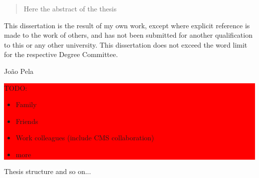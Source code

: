   


\begin{abstract}%
Here the abstract of the thesis
\end{abstract}


\begin{declaration}
  This dissertation is the result of my own work, except where explicit
  reference is made to the work of others, and has not been submitted
  for another qualification to this or any other university. This
  dissertation does not exceed the word limit for the respective Degree
  Committee.
  \vspace*{1cm}
  \begin{flushright}
    João Pela
  \end{flushright}
\end{declaration}


\begin{acknowledgements}


\colorbox{red}{
\begin{minipage}{0.8\linewidth}
  
TODO:

\begin{itemize}
  \item Family
  \item Friends
  \item Work colleagues (include CMS collaboration)
  \item more
\end{itemize}

\end{minipage}
}
\end{acknowledgements}



\begin{preface}
Thesis structure and so on...
\end{preface}

\dedication{To my grand mother}


\tableofcontents

 
